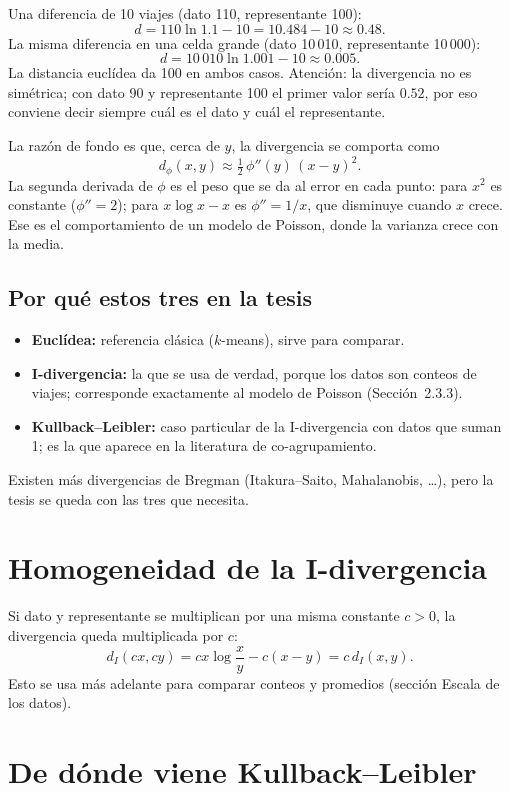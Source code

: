 \documentclass[11pt,a4paper]{article}
\begin{document}
Una diferencia de 10 viajes (dato 110, representante 100):
\[
  d=110\ln 1.1-10=10.484-10\approx\mathbf{0.48}.
\]
La misma diferencia en una celda grande (dato 10\,010, representante 10\,000):
\[
  d=10\,010\ln 1.001-10\approx\mathbf{0.005}.
\]
La distancia euclídea da 100 en ambos casos. Atención: la divergencia no es
simétrica; con dato 90 y representante 100 el primer valor sería $0.52$, por eso
conviene decir siempre cuál es el dato y cuál el representante.

La razón de fondo es que, cerca de $y$, la divergencia se comporta como
\[
  d_\phi(x,y)\approx\tfrac12\,\phi''(y)\,(x-y)^2 .
\]
La segunda derivada de $\phi$ es el \guillemotleft{}peso\guillemotright{} que se da al error en cada punto:
para $x^2$ es constante ($\phi''=2$); para $x\log x-x$ es $\phi''=1/x$, que
disminuye cuando $x$ crece. Ese es el comportamiento de un modelo de Poisson,
donde la varianza crece con la media.

\subsection{Por qué estos tres en la tesis}

\begin{itemize}
  \item \textbf{Euclídea:} referencia clásica ($k$-means), sirve para comparar.
  \item \textbf{I-divergencia:} la que se usa de verdad, porque los datos son
  conteos de viajes; corresponde exactamente al modelo de Poisson
  (Sección~2.3.3).
  \item \textbf{Kullback--Leibler:} caso particular de la I-divergencia con datos
  que suman 1; es la que aparece en la literatura de co-agrupamiento.
\end{itemize}
Existen más divergencias de Bregman (Itakura--Saito, Mahalanobis, \dots), pero la
tesis se queda con las tres que necesita.

\section{Homogeneidad de la I-divergencia}

Si dato y representante se multiplican por una misma constante $c>0$, la
divergencia queda multiplicada por $c$:
\[
  d_I(cx,cy)=cx\log\frac{x}{y}-c(x-y)=c\,d_I(x,y).
\]
Esto se usa más adelante para comparar conteos y promedios (sección \guillemotleft{}Escala de
los datos\guillemotright{}).

\section{De dónde viene Kullback--Leibler}
\end{document}
